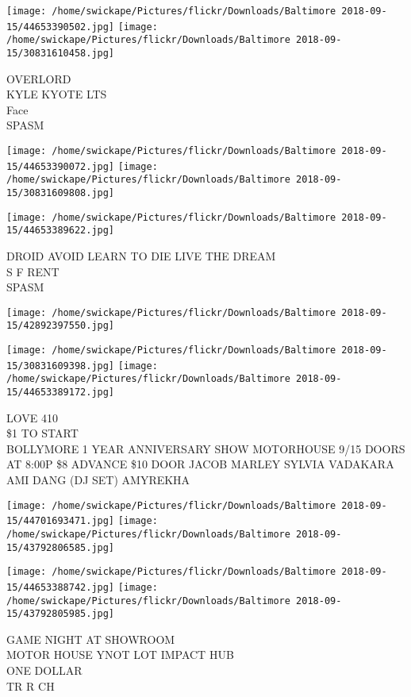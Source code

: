 \documentclass[10pt,letterpaper]{article}
\begin{document}
\texttt{[image: /home/swickape/Pictures/flickr/Downloads/Baltimore 2018-09-15/44653390502.jpg]}
\texttt{[image: /home/swickape/Pictures/flickr/Downloads/Baltimore 2018-09-15/30831610458.jpg]}

OVERLORD\\
KYLE KYOTE LTS\\
Face\\
SPASM
\pagebreak

\texttt{[image: /home/swickape/Pictures/flickr/Downloads/Baltimore 2018-09-15/44653390072.jpg]}
\texttt{[image: /home/swickape/Pictures/flickr/Downloads/Baltimore 2018-09-15/30831609808.jpg]}

\texttt{[image: /home/swickape/Pictures/flickr/Downloads/Baltimore 2018-09-15/44653389622.jpg]}

DROID AVOID LEARN TO DIE LIVE THE DREAM\\
S F RENT\\
SPASM
\pagebreak

\texttt{[image: /home/swickape/Pictures/flickr/Downloads/Baltimore 2018-09-15/42892397550.jpg]}

\vspace{0.25in}
\texttt{[image: /home/swickape/Pictures/flickr/Downloads/Baltimore 2018-09-15/30831609398.jpg]}
\texttt{[image: /home/swickape/Pictures/flickr/Downloads/Baltimore 2018-09-15/44653389172.jpg]}

LOVE 410\\
\$1 TO START\\
BOLLYMORE 1 YEAR ANNIVERSARY SHOW MOTORHOUSE 9/15 DOORS AT 8:00P \$8 ADVANCE \$10 DOOR JACOB MARLEY SYLVIA VADAKARA AMI DANG (DJ SET) AMYREKHA
\pagebreak

\texttt{[image: /home/swickape/Pictures/flickr/Downloads/Baltimore 2018-09-15/44701693471.jpg]}
\texttt{[image: /home/swickape/Pictures/flickr/Downloads/Baltimore 2018-09-15/43792806585.jpg]}

\texttt{[image: /home/swickape/Pictures/flickr/Downloads/Baltimore 2018-09-15/44653388742.jpg]}
\texttt{[image: /home/swickape/Pictures/flickr/Downloads/Baltimore 2018-09-15/43792805985.jpg]}

GAME NIGHT AT SHOWROOM\\
MOTOR HOUSE YNOT LOT IMPACT HUB\\
ONE DOLLAR\\
TR R CH
\pagebreak
\end{document}
